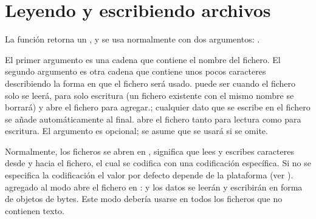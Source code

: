\documentclass[a5paper,10pt,spanish]{sphinxmanual}
\begin{document}
\section{Leyendo y escribiendo archivos}
\label{\detokenize{tutorial/inputoutput:reading-and-writing-files}}\label{\detokenize{tutorial/inputoutput:tut-files}}
\ignorespaces 
\sphinxAtStartPar
La función  retorna un {\hyperref[\detokenize{glossary:term-file-object}]{}}, y se usa normalmente con dos argumentos: .

\begin{sphinxVerbatim}[commandchars=\\\{\}]
   
\end{sphinxVerbatim}

\sphinxAtStartPar
El primer argumento es una cadena que contiene el nombre del fichero. El segundo argumento es otra cadena que contiene unos pocos caracteres describiendo la forma en que el fichero será usado.  puede ser  cuando el fichero solo se leerá,  para solo escritura (un fichero existente con el mismo nombre se borrará) y  abre el fichero  para agregar.; cualquier dato que se escribe en el fichero se añade automáticamente al final.   abre el fichero tanto para lectura como para escritura. El argumento  es opcional; se asume que se usará  si se omite.

\sphinxAtStartPar
Normalmente, los ficheros se abren en , significa que lees y escribes caracteres desde y hacia el fichero, el cual se codifica con una codificación específica. Si no se especifica la codificación el valor por defecto depende de la plataforma (ver ).  agregado al modo abre el fichero en  : y los datos se leerán y escribirán en forma de objetos de bytes. Este modo debería usarse en todos los ficheros que no contienen texto.
\end{document}
